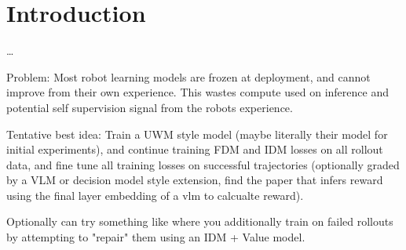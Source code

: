 \section{Introduction}

\dots

Problem: Most robot learning models are frozen at deployment, and cannot improve from their own experience. This wastes compute used on inference and potential self supervision signal from the robots experience. 



Tentative best idea: Train a UWM style model (maybe literally their model for initial experiments), and continue training FDM and IDM losses on all rollout data, and fine tune all training losses on successful trajectories (optionally graded by a VLM or decision model style extension, find the paper that infers reward using the final layer embedding of a vlm to calcualte reward). 

Optionally can try something like \cite{chen2026robot} where you additionally train on failed rollouts by attempting to "repair" them using an IDM + Value model.

